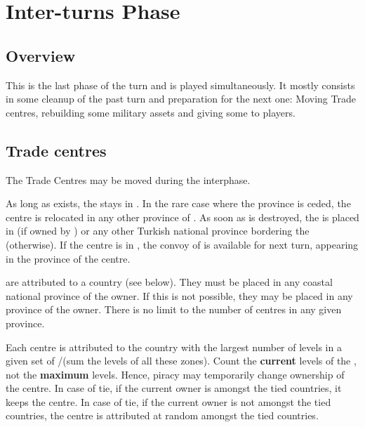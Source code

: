 
\chapter{Inter-turns Phase}\label{chapter:Inter}


\section{Overview}
\aparag This is the last phase of the turn and is played
simultaneously. It mostly consists in some cleanup of the past turn and
preparation for the next one: Moving Trade centres, rebuilding some
military assets and giving some \VPs to players.

\aparag[Sequence.]
\InterDetails

\section{Trade centres}\label{chInter:Trade Centres}

\aparag The Trade Centres may be moved during the interphase.

 As long as \paysEgypte exists, the 
stays in \provinceNil. In the rare case where the province is ceded, the
centre is relocated in any other province of \paysEgypte.
\bparag As soon as \paysEgypte is destroyed, the  is placed
in \provinceIzmir (if owned by \TUR) or any other Turkish national province
bordering the \regionMediterrannee (otherwise).
\bparag If the centre is in \TUR, the convoy of  is available for
next turn, appearing in the province of the centre.

 are attributed to a country (see below).
\bparag They must be placed in any coastal national province of the owner.
\bparag If this is not possible, they may be placed in any province of the
owner.
\bparag There is no limit to the number of centres in any given province.

\aparag[Attribution] Each centre is attributed to the country with the largest
number of \TradeFLEET levels in a given set of \STZ/\CTZ (sum the levels of
all these zones).
\bparag Count the \textbf{current} levels of the \TradeFLEET, not the
\textbf{maximum} levels. Hence, piracy may temporarily change ownership of the
centre.
\bparag In case of tie, if the current owner is amongst the tied countries, it
keeps the centre.
\bparag In case of tie, if the current owner is not amongst the tied
countries, the centre is attributed at random amongst the tied countries.

